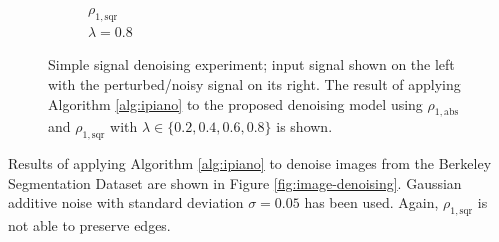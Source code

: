 \documentclass[onecolumn,final,a4paper,13pt,reqno]{siamart}
\begin{document}
\begin{figure}[t]
\begin{subfigure}[t]{0.08\textwidth}
		\scriptsize $\rho_{1,\text{sqr}}$\\[2px]
		\scriptsize $\lambda = 0.8$
	\end{subfigure}
	\caption{Simple signal denoising experiment; input signal shown on the left with the perturbed/noisy signal on its right. The result of applying Algorithm \ref{alg:ipiano} to the proposed denoising model using $\rho_{1, \text{abs}}$ and $\rho_{1,\text{sqr}}$ with $\lambda \in \{0.2,0.4,0.6,0.8\}$ is shown.}
	\label{fig:signal-denoising}
\end{figure}

Results of applying Algorithm \ref{alg:ipiano} to denoise images from the Berkeley Segmentation Dataset \cite{ArbelaezMaireFowlkesMalik:2011} are shown in Figure \ref{fig:image-denoising}. Gaussian additive noise with standard deviation $\sigma = 0.05$ has been used. Again, $\rho_{1,\text{sqr}}$ is not able to preserve edges.
\end{document}
